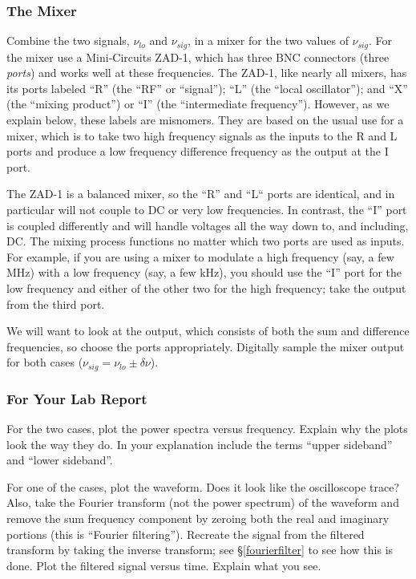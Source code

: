\documentclass[11pt]{article}
\begin{document}
\subsubsection{The Mixer}

Combine the two signals, $\nu_{lo}$ and $\nu_{sig}$, in a mixer for the
two values of $\nu_{sig}$.  For the mixer use a Mini-Circuits
ZAD-1, which has three BNC connectors (three {\it ports}) and works well
at these frequencies.  The ZAD-1, like nearly all mixers, has its ports
labeled ``R'' (the ``RF'' or ``signal''); ``L'' (the ``local
oscillator''); and ``X'' (the ``mixing product'') or ``I'' (the
``intermediate frequency'').  However, as we explain below, these labels
are misnomers.  They are based on the usual use for a mixer, which is to
take two high frequency signals as the inputs to the R and L ports and
produce a low frequency difference frequency as the output at the I
port.

        The ZAD-1 is a balanced mixer, so the ``R'' and ``L`` ports are
identical, and in particular will not couple to DC or very low
frequencies.  In contrast, the ``I'' port is coupled differently and
will handle voltages all the way down to, and including, DC.  The mixing
process functions no matter which two ports are used as inputs.  For
example, if you are using a mixer to modulate a high frequency (say, a
few MHz) with a low frequency (say, a few kHz), you should use the ``I''
port for the low frequency and either of the other two for the high
frequency; take the output from the third port.

We will want to look at the output, which consists of both the sum
and difference frequencies, so choose the ports appropriately. Digitally
sample the mixer output for both cases ($\nu_{sig} = \nu_{lo} \pm \delta
\nu$).

\subsubsection{For Your Lab Report} \label{digsamp}

        For the two cases, plot the power spectra versus
frequency. Explain why the plots look the way they do. In your
explanation include the terms ``upper sideband'' and ``lower sideband''.

For one of the cases, plot the waveform.  Does it look like the
oscilloscope trace? Also, take the Fourier transform (not the power
spectrum) of the waveform and remove the sum frequency component by
zeroing both the real and imaginary portions (this is ``Fourier
filtering'').  Recreate the signal from the filtered transform by taking
the inverse transform; see \S \ref{fourierfilter} to see how this is
done. Plot the filtered signal versus time.  Explain what you see.
\end{document}
